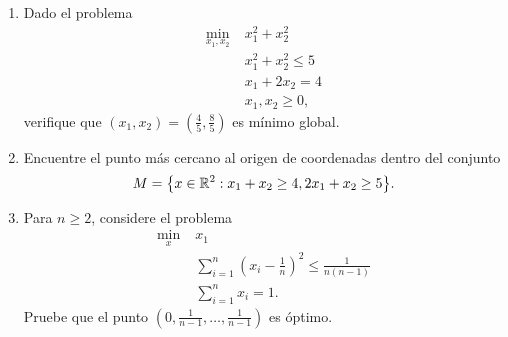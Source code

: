 \documentclass{article}
\begin{document}
\begin{enumerate}
	\item Dado el problema
		\begin{align*}
			\min_{x_1, x_2} \; & x_1^2 + x_2^2 \\
					   & x_1^2 + x_2^2 \leq 5 \\
					   & x_1 + 2x_2 = 4 \\
					   &x_1, x_2 \geq 0,
		\end{align*}
		verifique que \((x_1, x_2) = \left(\frac{4}{5}, \frac{8}{5}\right)\) es mínimo global.
	\item Encuentre el punto más cercano al origen de coordenadas dentro del conjunto
		\[
			M = \qty{x \in \mathbb{R}^2 : x_1 + x_2 \geq 4, 2x_1 + x_2 \geq 5}.
		\]
	\item Para \(n \geq 2\), considere el problema
		\begin{align*}
			\min_{x} \; & x_1 \\
				    & \sum_{i=1}^n \left(x_i - \frac{1}{n}\right)^2 \leq \frac{1}{n(n-1)} \\
				    & \sum_{i=1}^n x_i = 1.
		\end{align*}
		Pruebe que el punto \(\left(0, \frac{1}{n-1}, \dots, \frac{1}{n-1}\right)\) es óptimo.
\end{enumerate}
\end{document}
